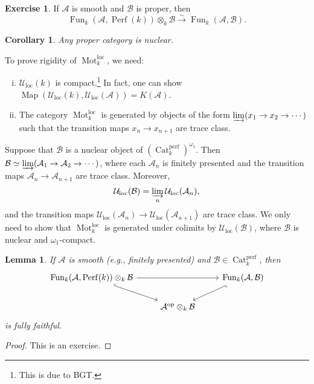 \documentclass[draft]{amsart}
\newcommand{\cat}[1]{\mathcal{#1}}
\newcommand{\op}{\mathrm{op}}
\newcommand{\isoto}{\mathbin{\xrightarrow{\sim}}}
\DeclareMathOperator{\Map}{Map}
\DeclareMathOperator{\Cat}{Cat}
\DeclareMathOperator{\Fun}{Fun}
\DeclareMathOperator{\Perf}{Perf}
\DeclareMathOperator{\Mot}{Mot}
\newtheorem{lem}[thm]{Lemma}
\newtheorem{cor}[thm]{Corollary}
\theoremstyle{definition}
\newtheorem{exercise}[thm]{Exercise}
\begin{document}
\begin{exercise}
If $\cat A$ is smooth and $\cat B$ is proper, then
\[
\Fun_k(\cat A, \Perf(k)) \otimes_k \cat B \isoto \Fun_k(\cat A, \cat B).
\]
\end{exercise}

\begin{cor}
Any proper category is nuclear.
\end{cor}

To prove rigidity of $\Mot_k^{\mathrm{loc}}$, we need:
\begin{enumerate}[(i)]
\item $\cat U_{\mathrm{loc}}(k)$ is compact.\footnote{This is due to BGT.} In fact, one can show $\Map(\cat U_{\mathrm{loc}}(k), \cat U_{\mathrm{loc}}(\cat A)) = K(\cat A)$.

\item The category $\Mot_k^{\mathrm{loc}}$ is generated by objects of the form $\varinjlim(x_1\to x_2\to \dotsb)$ such that the transition maps $x_n\to x_{n+1}$ are trace class.
\end{enumerate}

Suppose that $\cat B$ is a nuclear object of $(\Cat_k^{\mathrm{perf}})^{\omega_1}$. Then $\cat B \simeq \varinjlim(\cat A_1\to \cat A_2\to\dotsb)$, where each $\cat A_n$ is finitely presented and the transition maps $\cat A_n\to \cat A_{n+1}$ are trace class. Moreover, 
\[
\cat U_{\mathrm{loc}}(\cat B) = \varinjlim_n \cat U_{\mathrm{loc}}(\cat A_n),
\]
and the transition maps $\cat U_{\mathrm{loc}}(\cat A_n) \to \cat U_{\mathrm{loc}}(\cat A_{n+1})$ are trace class. We only need to show that $\Mot^{\mathrm{loc}}_k$ is generated under colimits by $\cat U_{\mathrm{loc}}(\cat B)$, where $\cat B$ is nuclear and $\omega_1$-compact.

\begin{lem}
If $\cat A$ is smooth (e.g., finitely presented) and $\cat B \in \Cat^{\mathrm{perf}}_k$, then
\[
\begin{tikzcd}
\Fun_k(\cat A, \Perf(k))\otimes_k \cat B \ar[dr,hook] \ar[rr] & & \Fun_k(\cat A, \cat B) \ar[dl,hook] \\
& \cat A^\op\otimes_k\cat B
\end{tikzcd}
\]
is fully faithful.
\end{lem}
\begin{proof}
This is an exercise.
\end{proof}
\end{document}
